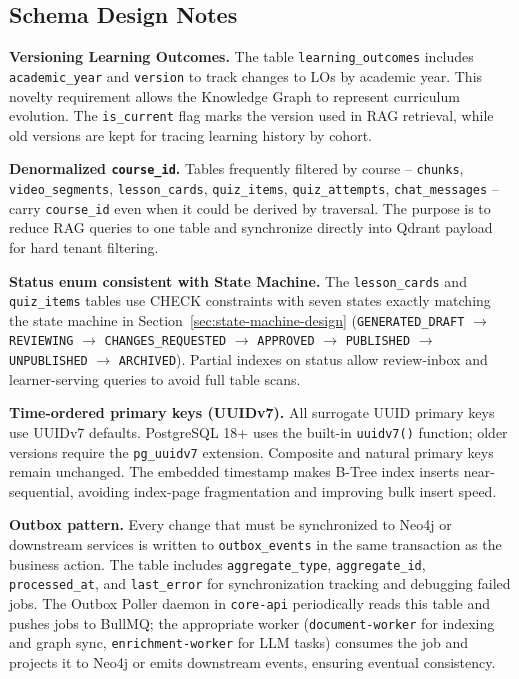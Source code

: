 \subsection*{Schema Design Notes}

\textbf{Versioning Learning Outcomes.} The table
\texttt{learning\_outcomes} includes \texttt{academic\_year} and
\texttt{version} to track changes to LOs by academic year. This novelty
requirement allows the Knowledge Graph to represent curriculum evolution.
The \texttt{is\_current} flag marks the version used in RAG retrieval,
while old versions are kept for tracing learning history by cohort.

\textbf{Denormalized \texttt{course\_id}.} Tables frequently filtered by
course -- \texttt{chunks}, \texttt{video\_segments},
\texttt{lesson\_cards}, \texttt{quiz\_items}, \texttt{quiz\_attempts},
\texttt{chat\_messages} -- carry \texttt{course\_id} even when it could
be derived by traversal. The purpose is to reduce RAG queries to one
table and synchronize directly into Qdrant payload for hard tenant
filtering.

\textbf{Status enum consistent with State Machine.} The
\texttt{lesson\_cards} and \texttt{quiz\_items} tables use CHECK
constraints with seven states exactly matching the state machine in
Section~\ref{sec:state-machine-design}
(\texttt{GENERATED\_DRAFT} $\to$ \texttt{REVIEWING} $\to$
\texttt{CHANGES\_REQUESTED} $\to$ \texttt{APPROVED} $\to$
\texttt{PUBLISHED} $\to$ \texttt{UNPUBLISHED} $\to$ \texttt{ARCHIVED}).
Partial indexes on status allow review-inbox and learner-serving queries
to avoid full table scans.

\textbf{Time-ordered primary keys (UUIDv7).} All surrogate UUID primary
keys use UUIDv7 defaults. PostgreSQL 18+ uses the built-in
\texttt{uuidv7()} function; older versions require the
\texttt{pg\_uuidv7} extension. Composite and natural primary keys remain
unchanged. The embedded timestamp makes B-Tree index inserts
near-sequential, avoiding index-page fragmentation and improving bulk
insert speed.

\textbf{Outbox pattern.} Every change that must be synchronized to Neo4j
or downstream services is written to \texttt{outbox\_events} in the same
transaction as the business action. The table includes
\texttt{aggregate\_type}, \texttt{aggregate\_id},
\texttt{processed\_at}, and \texttt{last\_error} for synchronization
tracking and debugging failed jobs. The Outbox Poller daemon in
\texttt{core-api} periodically reads this table and pushes jobs to
BullMQ; the appropriate worker (\texttt{document-worker} for indexing and
graph sync, \texttt{enrichment-worker} for LLM tasks) consumes the job and
projects it to Neo4j or emits downstream events, ensuring eventual
consistency.

